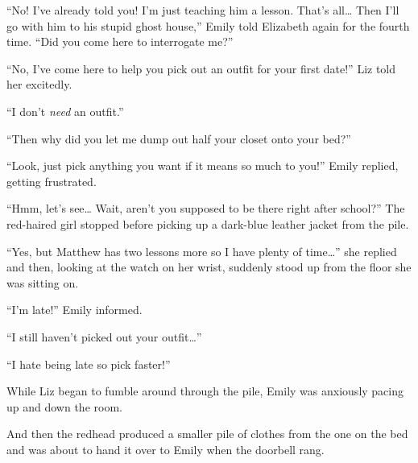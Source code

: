 “No! I’ve already told you! I’m just teaching him a lesson. That’s all… Then I’ll go with him to his stupid ghost house,” Emily told Elizabeth again for the fourth time. “Did you come here to interrogate me?”

“No, I’ve come here to help you pick out an outfit for your first date!” Liz told her excitedly.

“I don’t \textit{need} an outfit.”

“Then why did you let me dump out half your closet onto your bed?”

“Look, just pick anything you want if it means so much to you!” Emily replied, getting frustrated.

“Hmm, let’s see… Wait, aren’t you supposed to be there right after school?” The red-haired girl stopped before picking up a dark-blue leather jacket from the pile.

“Yes, but Matthew has two lessons more so I have plenty of time…” she replied and then, looking at the watch on her wrist, suddenly stood up from the floor she was sitting on.

“I’m late!” Emily informed.

“I still haven't picked out your outfit…”

“I hate being late so pick faster!”

While Liz began to fumble around through the pile, Emily was anxiously pacing up and down the room.

And then the redhead produced a smaller pile of clothes from the one on the bed and was about to hand it over to Emily when the doorbell rang.